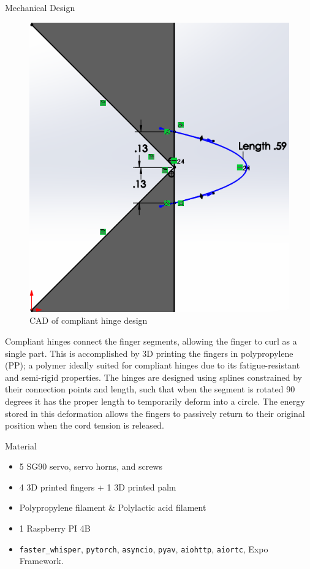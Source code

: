 \documentclass[final, 20pt]{beamer}
\newlength{\colwidth}
\begin{document}
\begin{frame}[t]
\begin{columns}[t]
\begin{column}{\colwidth}
\begin{block}{Mechanical Design}
        \begin{figure}
          \centering
          \includegraphics[width=0.75\linewidth]{images/compliant-hinge.png}
          \caption{CAD of compliant hinge design}
          \label{fig:compliant-hinge}
        \end{figure}

        Compliant hinges connect the finger segments, allowing the finger to curl as a single part. This is accomplished by 3D printing the fingers in polypropylene (PP); a polymer ideally suited for compliant hinges due to its fatigue-resistant and semi-rigid properties. The hinges are designed using splines constrained by their connection points and length, such that when the segment is rotated 90 degrees it has the proper length to temporarily deform into a circle. The energy stored in this deformation allows the fingers to passively return to their original position when the cord tension is released.
      \end{block}

      \begin{block}{Material}
        \begin{itemize}
          \item 5 SG90 servo, servo horns, and screws
          \item 4 3D printed fingers + 1 3D printed palm
          \item Polypropylene filament \& Polylactic acid filament
          \item 1 Raspberry PI 4B
          \item \texttt{faster\_whisper}, \texttt{pytorch}, \texttt{asyncio}, \texttt{pyav}, \texttt{aiohttp}, \texttt{aiortc}, Expo Framework.
        \end{itemize}
      \end{block}



\end{column}
\end{columns}
\end{frame}
\end{document}
